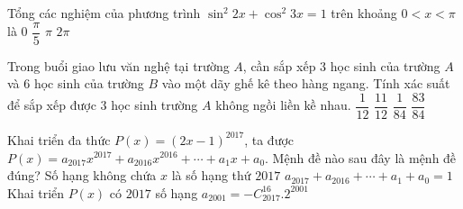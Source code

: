 \begin{ex}%
Tổng các nghiệm của phương trình $\sin^2 2x+\cos^2 3x=1$ trên khoảng $0<x<\pi$ là
\choice
{$0$}
{$\dfrac{\pi}{5}$}
{$\pi $}
{\True $2\pi$}
\end{ex}

\begin{ex}%
Trong buổi giao lưu văn nghệ tại trường $A$, cần sắp xếp $3$ học sinh của trường $A$ và $6$ học sinh của trường $B$ vào một dãy ghế kê theo hàng ngang. Tính xác suất để sắp xếp được $3$ học sinh trường $A$ không ngồi liền kề nhau.
\choice
{$\dfrac{1}{12}$}
{\True $\dfrac{11}{12}$}
{$\dfrac{1}{84}$}
{$\dfrac{83}{84}$}
\end{ex}

\begin{ex}%
Khai triển đa thức $P(x) = (2x - 1)^{2017}$, ta được $P(x) = a_{2017}x^{2017} + a_{2016}x^{2016} + \cdots + a_1x + a_0$. Mệnh đề nào sau đây là mệnh đề đúng?
\choice
{Số hạng không chứa $x$ là số hạng thứ $2017$}
{\True $a_{2017} + a_{2016} + \cdots + a_1 + a_0 = 1$}
{Khai triển $P(x)$ có $2017$ số hạng}
{$a_{2001} = -C_{2017}^{16}.2^{2001}$}
\end{ex}

